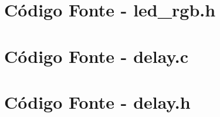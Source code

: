 \documentclass{article}
\begin{document}
\clearpage
\section{Código Fonte - led\_rgb.h}


\clearpage
\section{Código Fonte - delay.c}


\clearpage
\section{Código Fonte - delay.h}

\end{document}
